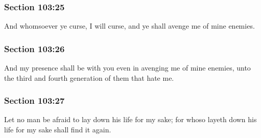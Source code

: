	\subsubsection{Section 103:25} %
		\label{DC103-25}

		And whomsoever ye curse, I will curse, and ye shall avenge me of mine enemies.


	\subsubsection{Section 103:26} %
		\label{DC103-26}

		And my presence shall be with you even in avenging me of mine enemies, unto the third and fourth generation of them that hate me.


	\subsubsection{Section 103:27} %
		\label{DC103-27}

		Let no man be afraid to lay down his life for my sake; for whoso layeth down his life for my sake shall find it again.


